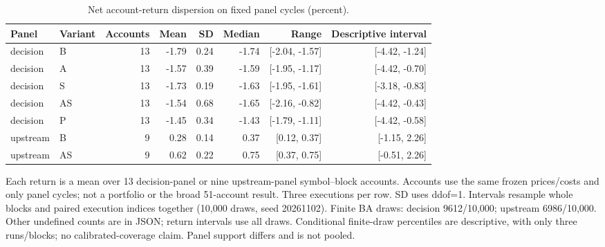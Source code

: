 \begin{table}[htbp]
\centering\small
\caption{Net account-return dispersion on fixed panel cycles (percent).}
\label{tab:r3_returns}
\setlength{\tabcolsep}{3.5pt}
\begin{tabular}{llrrrrrr}
\hline
Panel & Variant & Accounts & Mean & SD & Median & Range & Descriptive interval \\
\hline
decision & B & 13 & -1.79 & 0.24 & -1.74 & [-2.04, -1.57] & [-4.42, -1.24] \\
decision & A & 13 & -1.57 & 0.39 & -1.59 & [-1.95, -1.17] & [-4.42, -0.70] \\
decision & S & 13 & -1.73 & 0.19 & -1.63 & [-1.95, -1.61] & [-3.18, -0.83] \\
decision & AS & 13 & -1.54 & 0.68 & -1.65 & [-2.16, -0.82] & [-4.42, -0.43] \\
decision & P & 13 & -1.45 & 0.34 & -1.43 & [-1.79, -1.11] & [-4.42, -0.58] \\
upstream & B & 9 & 0.28 & 0.14 & 0.37 & [0.12, 0.37] & [-1.15, 2.26] \\
upstream & AS & 9 & 0.62 & 0.22 & 0.75 & [0.37, 0.75] & [-0.51, 2.26] \\
\hline
\end{tabular}
\par\smallskip\footnotesize Each return is a mean over 13 decision-panel or nine upstream-panel symbol--block accounts. Accounts use the same frozen prices/costs and only panel cycles; not a portfolio or the broad 51-account result. Three executions per row. SD uses ddof=1. Intervals resample whole blocks and paired execution indices together (10,000 draws, seed 20261102). Finite BA draws: decision 9612/10,000; upstream 6986/10,000. Other undefined counts are in JSON; return intervals use all draws. Conditional finite-draw percentiles are descriptive, with only three runs/blocks; no calibrated-coverage claim. Panel support differs and is not pooled.
\end{table}
